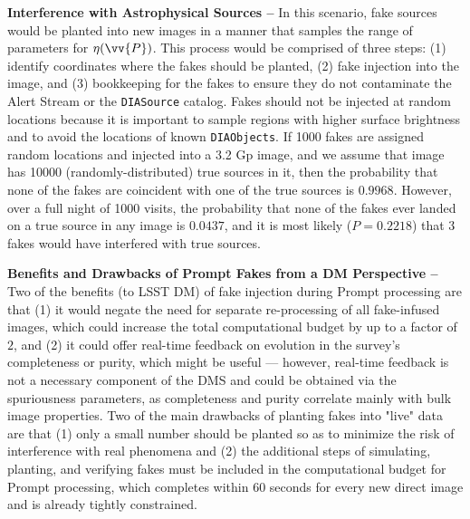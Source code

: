{\bf Interference with Astrophysical Sources -- } In this scenario, fake sources would be planted into new images in a manner that samples the range of parameters for $\eta(\vv{P})$. This process would be comprised of three steps: (1) identify coordinates where the fakes should be planted, (2) fake injection into the image, and (3) bookkeeping for the fakes to ensure they do not contaminate the Alert Stream or the {\tt DIASource} catalog. Fakes should not be injected at random locations because it is important to sample regions with higher surface brightness and to avoid the locations of known {\tt DIAObjects}. If 1000 fakes are  assigned random locations and injected into a 3.2 Gp image, and we assume that image has 10000 (randomly-distributed) true sources in it, then the probability that none of the fakes are coincident with one of the true sources is $0.9968$. However, over a full night of 1000 visits, the probability that none of the fakes ever landed on a true source in any image is $0.0437$, and it is most likely ($P=0.2218$) that 3 fakes would have interfered with true sources. 

{\bf Benefits and Drawbacks of Prompt Fakes from a DM Perspective -- } Two of the benefits (to LSST DM) of fake injection during Prompt processing are that (1) it would negate the need for separate re-processing of all fake-infused images, which could increase the total computational budget by up to a factor of $2$, and (2) it could offer real-time feedback on evolution in the survey's completeness or purity, which might be useful --- however, real-time feedback is not a necessary component of the DMS and could be obtained via the spuriousness parameters, as completeness and purity correlate mainly with bulk image properties. Two of the main drawbacks of planting fakes into "live" data are that (1) only a small number should be planted so as to minimize the risk of interference with real phenomena and (2) the additional steps of simulating, planting, and verifying fakes must be included in the computational budget for Prompt processing, which completes within $60$ seconds for every new direct image and is already tightly constrained. 

